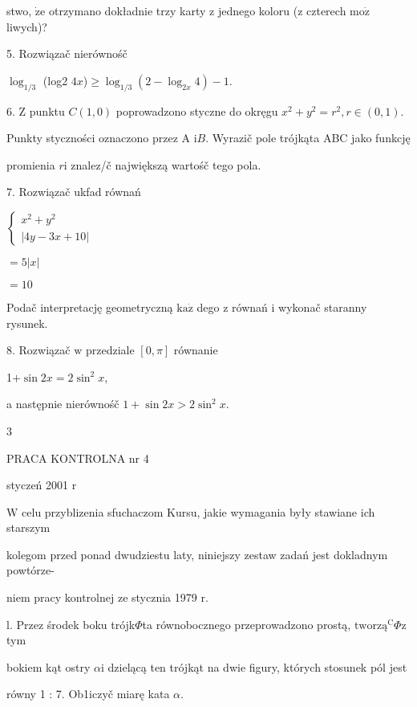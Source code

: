 \documentclass[a4paper,12pt]{article}
\begin{document}
stwo, $\dot{\mathrm{z}}\mathrm{e}$ otrzymano dokładnie trzy karty $\mathrm{z}$ jednego koloru ($\mathrm{z}$ czterech $\mathrm{m}\mathrm{o}\dot{\mathrm{z}}$ liwych)?

5. Rozwiązač nierównośč

$\log_{1/3}$ (log2 $4x$)$\geq\log_{1/3}(2-\log_{2x}4)-1.$

6. $\mathrm{Z}$ punktu $C(1,0)$ poprowadzono styczne do okręgu $x^{2}+y^{2} =r^{2}, r \in (0,1).$

Punkty styczności oznaczono przez A $\mathrm{i}B$. Wyrazič pole trójkąta ABC jako funkcję

promienia $r\mathrm{i}$ znalez/č największą wartośč tego pola.

7. Rozwiązač ukfad równań

$\left\{\begin{array}{l}
x^{2}+y^{2}\\
|4y-3x+10|
\end{array}\right.$

$=5|x|$

$=10$

Podač interpretację geometryczną $\mathrm{k}\mathrm{a}\dot{\mathrm{z}}$ dego $\mathrm{z}$ równań $\mathrm{i}$ wykonač staranny rysunek.

8. Rozwiązač $\mathrm{w}$ przedziale $[0,\pi]$ równanie

1$+ \sin 2x=2\sin^{2}x,$

a następnie nierównośč $1+\sin 2x>2\sin^{2}x.$

3





PRACA KONTROLNA nr 4

styczeń 2001 $\mathrm{r}$

$\mathrm{W}$ celu przyblizenia sfuchaczom Kursu, jakie wymagania były stawiane ich starszym

kolegom przed ponad dwudziestu laty, niniejszy zestaw zadań jest dokladnym powtórze-

niem pracy kontrolnej ze stycznia 1979 $\mathrm{r}.$

l. Przez środek boku trójk$\Phi$ta równobocznego przeprowadzono prostą, $\mathrm{t}\mathrm{w}\mathrm{o}\mathrm{r}\mathrm{z}\text{ą}^{\mathrm{C}}\Phi \mathrm{z}$ tym

bokiem kąt ostry $\alpha \mathrm{i}$ dzielącą ten trójkąt na dwie figury, których stosunek pól jest

równy 1 : 7. Ob1iczyč miarę kata $\alpha.$
\end{document}
